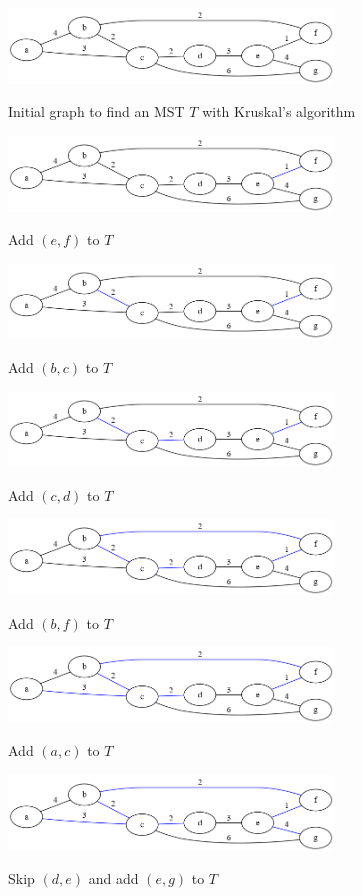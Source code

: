 \documentclass{book}
\begin{document}
\begin{figure}[ht]
\centering
\includegraphics[width=3.4in]{ch-spann/kruskal-1}
\label{kruskal1}
\caption{Initial graph to find an MST $T$ with Kruskal's algorithm}

\includegraphics[width=3.4in]{ch-spann/kruskal-2}
\label{kruskal2}
\caption{Add $(e,f)$ to $T$}

\includegraphics[width=3.4in]{ch-spann/kruskal-3}
\label{kruskal3}
\caption{Add $(b,c)$ to $T$}

\includegraphics[width=3.4in]{ch-spann/kruskal-4}
\label{kruskal4}
\caption{Add $(c,d)$ to $T$}

\includegraphics[width=3.4in]{ch-spann/kruskal-5}
\label{kruskal5}
\caption{Add $(b,f)$ to $T$}

\includegraphics[width=3.4in]{ch-spann/kruskal-6}
\label{kruskal6}
\caption{Add $(a,c)$ to $T$}

\includegraphics[width=3.4in]{ch-spann/kruskal-7}
\label{kruskal7}
\caption{Skip $(d,e)$ and add $(e,g)$ to $T$}
\end{figure}
\restoregeometry
\end{document}
